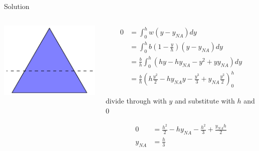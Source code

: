 \documentclass[10pt, svgnames]{beamer}
\begin{document}
\begin{frame}[label={sec:org5becb07}]{Solution}
\begin{columns}
\begin{column}{0.3\columnwidth}
\begin{center}
\includegraphics[width=.9\linewidth]{./pictures/triangular-section-axis.pdf}
\end{center}
\end{column}

\begin{column}{0.6\columnwidth}
\begin{align*}
  0 &= \int_{0}^{h} w(y - y_{NA})dy \\
    &= \int_{0}^{h} b \left( 1- \frac{y}{h} \right)(y - y_{NA})dy \\
    &= \frac{b}{h} \int_{0}^{h} (hy - hy_{NA} - y^{2} + yy_{NA})dy \\
    &= \frac{b}{h} \left( h \frac{y^{2}}{2} - hy_{NA}y - \frac{y^{3}}{3} + y_{NA}\frac{y^{2}}{2} \right)_{0}^{h}
\end{align*}

divide through with \(y\) and substitute with \(h\) and 0

\begin{align*}
  0 &= \frac{h^{2}}{2} - hy_{NA} - \frac{h^{2}}{3} + \frac{y_{NA}h}{2} \\
  y_{NA} &= \frac{h}{3}
\end{align*}
\end{column}
\end{columns}
\end{frame}
\end{document}
